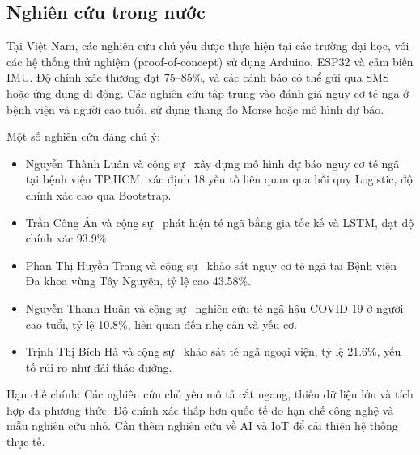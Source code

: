 \subsection{Nghiên cứu trong nước}
Tại Việt Nam, các nghiên cứu chủ yếu được thực hiện tại các trường đại học, với các hệ thống thử nghiệm (proof-of-concept) sử dụng Arduino, ESP32 và cảm biến IMU. Độ chính xác thường đạt 75--85\%, và các cảnh báo có thể gửi qua SMS hoặc ứng dụng di động. Các nghiên cứu tập trung vào đánh giá nguy cơ té ngã ở bệnh viện và người cao tuổi, sử dụng thang đo Morse hoặc mô hình dự báo.

Một số nghiên cứu đáng chú ý:
\begin{itemize}
    \item Nguyễn Thành Luân và cộng sự~\cite{nguyen2024} xây dựng mô hình dự báo nguy cơ té ngã tại bệnh viện TP.HCM, xác định 18 yếu tố liên quan qua hồi quy Logistic, độ chính xác cao qua Bootstrap.  
    \item Trần Công Án và cộng sự~\cite{tran2017} phát hiện té ngã bằng gia tốc kế và LSTM, đạt độ chính xác 93.9\%.  
    \item Phan Thị Huyền Trang và cộng sự~\cite{phan2022} khảo sát nguy cơ té ngã tại Bệnh viện Đa khoa vùng Tây Nguyên, tỷ lệ cao 43.58\%.  
    \item Nguyễn Thanh Huân và cộng sự~\cite{nguyen2023} nghiên cứu té ngã hậu COVID-19 ở người cao tuổi, tỷ lệ 10.8\%, liên quan đến nhẹ cân và yếu cơ.  
    \item Trịnh Thị Bích Hà và cộng sự~\cite{trinh2023} khảo sát té ngã ngoại viện, tỷ lệ 21.6\%, yếu tố rủi ro như đái tháo đường.
\end{itemize}

Hạn chế chính: Các nghiên cứu chủ yếu mô tả cắt ngang, thiếu dữ liệu lớn và tích hợp đa phương thức. Độ chính xác thấp hơn quốc tế do hạn chế công nghệ và mẫu nghiên cứu nhỏ. Cần thêm nghiên cứu về AI và IoT để cải thiện hệ thống thực tế.
